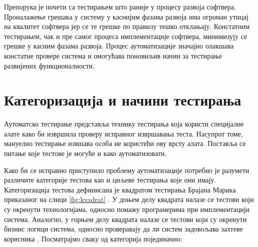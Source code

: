 \documentclass[12pt,oneside]{memoir}
\begin{document}
Препорука је почети са тестирањем што раније у процесу развоја софтвера. Проналажење грешака у систему у каснијим фазама развоја има огроман утицај на квалитет софтвера јер се те грешке по правилу тешко отклањају. Констатним тестирањем, чак и пре самог процеса имплементације софтвера, минимизују се грешке у касним фазама развоја. Процес аутоматизације значајно олакшава констатне провере система и омогућава поновиљив начин за тестирање развијених функционалности.


\section{Категоризација и начини тестирања}

Аутоматско тестирање представља технику тестирања која користи специјалне алате како би извршила проверу исправног извршавања теста. Насупрот томе, мануелно тестирање извшава особа не користећи ову врсту алата. Поставља се питање које тестове је могуће и како аутоматизовати.

Како би се исправно приступило проблему аутоматизације потребно је разумети различите категорије тестова као и циљеве тестирања које они имају. Категоризација тестова дефинисана је квадратом тестирања Брајана Марика приказаног на слици \ref{fig:kvadrat} \cite{testiranjeBook}. У доњем делу квадрата налазе се тестови који су окренути технологијама, односно помажу програмерима при имплементацији система. Аналогно, у горњем делу квадрата налазе се тестови који су окренути бизнис логици система, односно проверавају да ли систем задовољава захтеве корисника \cite{microservicesBook}. Посматрајмо сваку од категорија појединачно:
\end{document}
